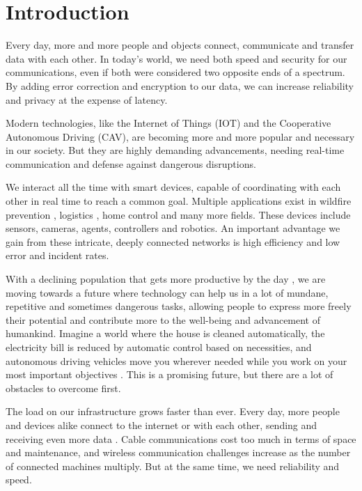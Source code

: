 \section{Introduction}

Every day, more and more people and objects connect, communicate and transfer data with each other. In today's world, we need both speed and security for our communications, even if both were considered two opposite ends of a spectrum. By adding error correction and encryption to our data, we can increase reliability and privacy at the expense of latency.

Modern technologies, like the Internet of Things (IOT) and the Cooperative Autonomous Driving (CAV), are becoming more and more popular and necessary in our society. But they are highly demanding advancements, needing real-time communication and defense against dangerous disruptions.

We interact all the time with smart devices, capable of coordinating with each other in real time to reach a common goal. Multiple applications exist in wildfire prevention \cite{RAMADAN2024101248}, logistics \cite{Lee18042018}, home control \cite{9928254} and many more fields. These devices include sensors, cameras, agents, controllers and robotics. An important advantage we gain from these intricate, deeply connected networks is high efficiency and low error and incident rates.

With a declining population \cite{af1cfa15} that gets more productive by the day \cite{The-Productivity-Pay-Gap}, we are moving towards a future where technology can help us in a lot of mundane, repetitive and sometimes dangerous tasks, allowing people to express more freely their potential and contribute more to the well-being and advancement of humankind. Imagine a world where the house is cleaned automatically, the electricity bill is reduced by automatic control based on necessities, and autonomous driving vehicles move you wherever needed while you work on your most important objectives \cite{The-Promises-of-Automation}. This is a promising future, but there are a lot of obstacles to overcome first.

The load on our infrastructure grows faster than ever. Every day, more people and devices alike connect to the internet or with each other, sending and receiving even more data \cite{Cloudflare-Radar-2024-Year-in-Review}. Cable communications cost too much in terms of space and maintenance, and wireless communication challenges increase as the number of connected machines multiply. But at the same time, we need reliability and speed.

